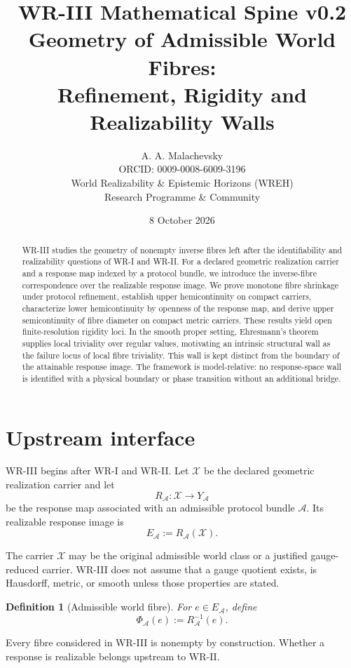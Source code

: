 \documentclass[11pt]{article}
\title{\textbf{WR-III Mathematical Spine v0.2}\\[4pt]
\large Geometry of Admissible World Fibres:\\
Refinement, Rigidity and Realizability Walls}
\author{A. A. Malachevsky\\
ORCID: 0009-0008-6009-3196\\
World Realizability \& Epistemic Horizons (WREH)\\
Research Programme \& Community}
\date{8 October 2026}
\newtheorem{definition}{Definition}[section]
\newcommand{\X}{\mathcal X}
\newcommand{\Acal}{\mathcal A}
\begin{document}
\maketitle

\begin{abstract}
WR-III studies the geometry of nonempty inverse fibres left after the
identifiability and realizability questions of WR-I and WR-II. For a declared
geometric realization carrier and a response map indexed by a protocol bundle,
we introduce the inverse-fibre correspondence over the realizable response
image. We prove monotone fibre shrinkage under protocol refinement, establish
upper hemicontinuity on compact carriers, characterize lower hemicontinuity by
openness of the response map, and derive upper semicontinuity of fibre diameter
on compact metric carriers. These results yield open finite-resolution
rigidity loci. In the smooth proper setting, Ehresmann's theorem supplies local
triviality over regular values, motivating an intrinsic structural wall as the
failure locus of local fibre triviality. This wall is kept distinct from the
boundary of the attainable response image. The framework is model-relative:
no response-space wall is identified with a physical boundary or phase
transition without an additional bridge.
\end{abstract}

\section{Upstream interface}

WR-III begins after WR-I and WR-II. Let \(\X\) be the declared geometric
realization carrier and let
\[
R_{\Acal}:\X\to Y_{\Acal}
\]
be the response map associated with an admissible protocol bundle \(\Acal\).
Its realizable response image is
\[
E_{\Acal}:=R_{\Acal}(\X).
\]

The carrier \(\X\) may be the original admissible world class or a justified
gauge-reduced carrier. WR-III does not assume that a gauge quotient exists, is
Hausdorff, metric, or smooth unless those properties are stated.

\begin{definition}[Admissible world fibre]
For \(e\in E_{\Acal}\), define
\[
\Phi_{\Acal}(e):=R_{\Acal}^{-1}(e).
\]
\end{definition}

Every fibre considered in WR-III is nonempty by construction. Whether a
response is realizable belongs upstream to WR-II.
\end{document}
